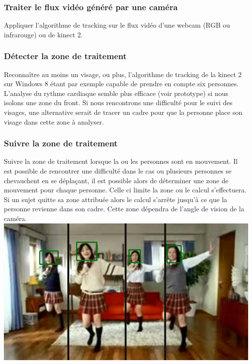 \documentclass[12pt,a4paper]{article}
\begin{document}
\subsubsection{Traiter le flux vidéo généré par une caméra}

Appliquer l'algorithme de tracking sur le flux vidéo d'une webcam (RGB ou infrarouge) ou de kinect 2.

\subsubsection{Détecter la zone de traitement}

Reconnaître au moins un visage, ou plus, l'algorithme de tracking de la kinect 2 sur Windows 8 étant par exemple capable de prendre en compte six personnes.
L'analyse du rythme cardiaque semble plus efficace (voir prototype) si nous isolons une zone du front.
Si nous rencontrons une difficulté pour le suivi des visages, une alternative serait de tracer un cadre pour que la personne place son visage dans cette zone à analyser.

\subsubsection{Suivre la zone de traitement}

Suivre la zone de traitement lorsque la ou les personnes sont en mouvement. Il est possible de rencontrer une difficulté dans le cas ou plusieurs personnes se chevauchent en se déplaçant, il est possible alors de déterminer une zone de mouvement pour chaque personne. Celle ci limite la zone ou le calcul s'effectuera. Si un sujet quitte sa zone attribuée alors le calcul s'arrête jusqu'à ce que la personne revienne dans son cadre.  Cette zone dépendra de l'angle de vision de la caméra.\\

\includegraphics[scale=0.60]{zone_mouvement.png}
\end{document}

